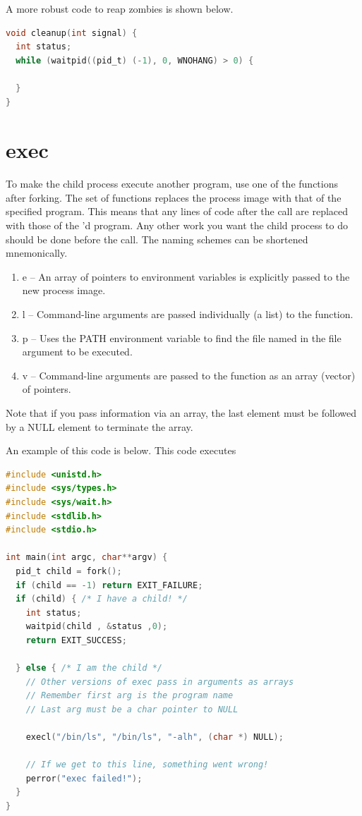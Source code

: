 A more robust code to reap zombies is shown below.

\begin{lstlisting}[language=C]
void cleanup(int signal) {
  int status;
  while (waitpid((pid_t) (-1), 0, WNOHANG) > 0) {

  }
}
\end{lstlisting}

\section{exec}

To make the child process execute another program, use one of the \href{http://man7.org/linux/man-pages/man3/exec.3.html}{} functions after forking.
The  set of functions replaces the process image with that of the specified program.
This means that any lines of code after the  call are replaced with those of the 'd program.
Any other work you want the child process to do should be done before the  call.
The naming schemes can be shortened mnemonically.

\begin{enumerate}
    \item e -- An array of pointers to environment variables is explicitly passed to the new process image.
    \item l -- Command-line arguments are passed individually (a list) to the function.
    \item p -- Uses the PATH environment variable to find the file named in the file argument to be executed.
    \item v -- Command-line arguments are passed to the function as an array (vector) of pointers.
\end{enumerate}

Note that if you pass information via an array, the last element must be followed by a NULL element to terminate the array.

An example of this code is below. This code executes 

\begin{lstlisting}[language=C]
#include <unistd.h>
#include <sys/types.h>
#include <sys/wait.h>
#include <stdlib.h>
#include <stdio.h>

int main(int argc, char**argv) {
  pid_t child = fork();
  if (child == -1) return EXIT_FAILURE;
  if (child) { /* I have a child! */
    int status;
    waitpid(child , &status ,0);
    return EXIT_SUCCESS;

  } else { /* I am the child */
    // Other versions of exec pass in arguments as arrays
    // Remember first arg is the program name
    // Last arg must be a char pointer to NULL

    execl("/bin/ls", "/bin/ls", "-alh", (char *) NULL);

    // If we get to this line, something went wrong!
    perror("exec failed!");
  }
}
\end{lstlisting}

